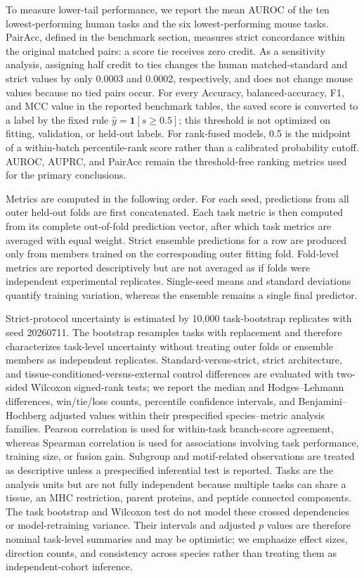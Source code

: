 To measure lower-tail performance, we report the mean AUROC of the ten lowest-performing human tasks and the six lowest-performing mouse tasks. PairAcc, defined in the benchmark section, measures strict concordance within the original matched pairs: a score tie receives zero credit. As a sensitivity analysis, assigning half credit to ties changes the human matched-standard and strict values by only 0.0003 and 0.0002, respectively, and does not change mouse values because no tied pairs occur. For every Accuracy, balanced-accuracy, F1, and MCC value in the reported benchmark tables, the saved score is converted to a label by the fixed rule \(\hat y=\mathbf{1}[s\geq0.5]\); this threshold is not optimized on fitting, validation, or held-out labels. For rank-fused models, 0.5 is the midpoint of a within-batch percentile-rank score rather than a calibrated probability cutoff. AUROC, AUPRC, and PairAcc remain the threshold-free ranking metrics used for the primary conclusions.

Metrics are computed in the following order. For each seed, predictions from all outer held-out folds are first concatenated. Each task metric is then computed from its complete out-of-fold prediction vector, after which task metrics are averaged with equal weight. Strict ensemble predictions for a row are produced only from members trained on the corresponding outer fitting fold. Fold-level metrics are reported descriptively but are not averaged as if folds were independent experimental replicates. Single-seed means and standard deviations quantify training variation, whereas the ensemble remains a single final predictor.

Strict-protocol uncertainty is estimated by 10,000 task-bootstrap replicates with seed 20260711. The bootstrap resamples tasks with replacement and therefore characterizes task-level uncertainty without treating outer folds or ensemble members as independent replicates. Standard-versus-strict, strict architecture, and tissue-conditioned-versus-external control differences are evaluated with two-sided Wilcoxon signed-rank tests; we report the median and Hodges--Lehmann differences, win/tie/loss counts, percentile confidence intervals, and Benjamini--Hochberg adjusted values within their prespecified species--metric analysis families. Pearson correlation is used for within-task branch-score agreement, whereas Spearman correlation is used for associations involving task performance, training size, or fusion gain. Subgroup and motif-related observations are treated as descriptive unless a prespecified inferential test is reported. Tasks are the analysis units but are not fully independent because multiple tasks can share a tissue, an MHC restriction, parent proteins, and peptide connected components. The task bootstrap and Wilcoxon test do not model these crossed dependencies or model-retraining variance. Their intervals and adjusted \(p\) values are therefore nominal task-level summaries and may be optimistic; we emphasize effect sizes, direction counts, and consistency across species rather than treating them as independent-cohort inference.

